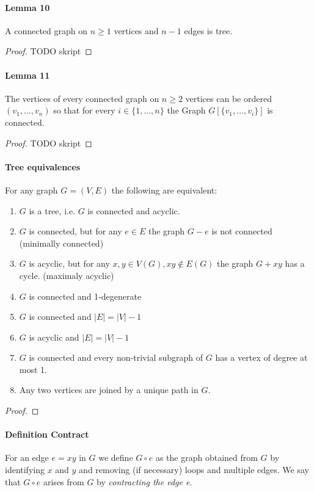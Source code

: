 \paragraph{Lemma 10} A connected graph on $ n \geq 1 $ vertices and $ n-1 $ edges is 
tree.
\begin{proof}
   TODO skript 
\end{proof}

\paragraph{Lemma 11} The vertices of every connected graph on $ n \geq 2 $ vertices 
can be ordered $ (v_1,...,v_n) $ so that for every $ i \in \{1,...,n\} $ the 
Graph $ G[\{v_1,...,v_i\}] $ is connected.
\begin{proof}
   TODO skript 
\end{proof}

\paragraph{Tree equivalences} For any graph $ G = (V,E) $ the following are equivalent:
\begin{enumerate}
    \item $G $ is a tree, i.e. $ G $ is connected and acyclic.
    \item $G $ is connected, but for any $ e \in E $ the graph $ G - e $ is not 
    connected (minimally connected)
    \item $G $ is acyclic, but for any $ x,y \in V(G), xy \notin E(G) $ the graph 
    $ G + xy $ has a cycle. (maximaly acyclic) 
    \item $G $ is connected and 1-degenerate
    \item $G $ is connected and $ |E| = |V| - 1 $
    \item $G $ is acyclic and $ |E| = |V| - 1 $
    \item $G $ is connected and every non-trivial subgraph of $ G $ has a vertex of 
    degree at most 1.
    \item Any two vertices are joined by a unique path in $ G $.
\end{enumerate}
\begin{proof}
    
\end{proof}

\paragraph{Definition Contract}
For an edge $ e = xy $ in $ G $ we define $ G \circ e $ as the graph obtained from 
$ G $ by identifying $ x $ and $ y $ and removing (if necessary) loops and 
multiple edges. We say that $ G \circ e $ arises from $ G $ by 
\textit{contracting the edge e}.

